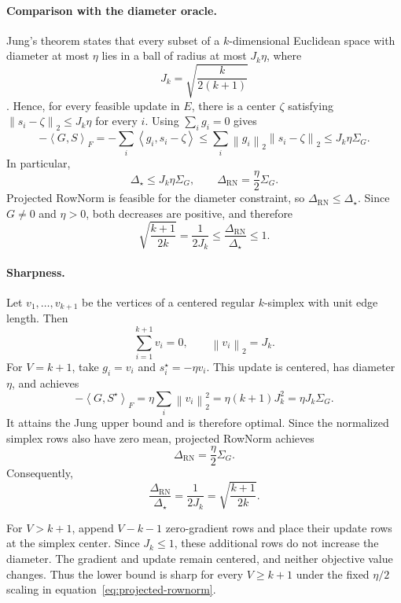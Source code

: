 \documentclass[anon]{opt2026} %
\newcommand{\norm}[1]{\left\lVert #1\right\rVert}
\newcommand{\inner}[2]{\left\langle #1,#2\right\rangle}
\begin{document}
\paragraph{Comparison with the diameter oracle.}
Jung's theorem states that every subset of a $k$-dimensional Euclidean space
with diameter at most $\eta$ lies in a ball of radius at most
$J_k\eta$, where
\[
J_k=\sqrt{\frac{k}{2(k+1)}}
\]
\citep{Jung1901,article}. Hence, for every feasible
update in $E$, there is a center $\zeta$ satisfying
$\norm{s_i-\zeta}_2\leq J_k\eta$ for every $i$. Using
$\sum_i g_i=0$ gives
\[
-\inner{G}{S}_F
=
-\sum_i\inner{g_i}{s_i-\zeta}
\leq
\sum_i\norm{g_i}_2\norm{s_i-\zeta}_2
\leq
J_k\eta\Sigma_G.
\]
In particular,
\[
\Delta_\star\leq J_k\eta\Sigma_G,
\qquad
\Delta_{\mathrm{RN}}=\frac{\eta}{2}\Sigma_G.
\]
Projected RowNorm is feasible for the diameter constraint, so
$\Delta_{\mathrm{RN}}\leq\Delta_\star$. Since
$G\neq0$ and $\eta>0$, both decreases are positive, and therefore
\[
\boxed{
\sqrt{\frac{k+1}{2k}}
=
\frac{1}{2J_k}
\leq
\frac{\Delta_{\mathrm{RN}}}{\Delta_\star}
\leq
1.
}
\]

\paragraph{Sharpness.}
Let $v_1,\ldots,v_{k+1}$ be the vertices of a centered regular
$k$-simplex with unit edge length. Then
\[
\sum_{i=1}^{k+1}v_i=0,
\qquad
\norm{v_i}_2=J_k.
\]
For $V=k+1$, take $g_i=v_i$ and $s_i^\star=-\eta v_i$. This update is
centered, has diameter $\eta$, and achieves
\[
-\inner{G}{S^\star}_F
=
\eta\sum_i\norm{v_i}_2^2
=
\eta(k+1)J_k^2
=
\eta J_k\Sigma_G.
\]
It attains the Jung upper bound and is therefore optimal. Since the normalized
simplex rows also have zero mean, projected RowNorm achieves
\[
\Delta_{\mathrm{RN}}
=
\frac{\eta}{2}\Sigma_G.
\]
Consequently,
\[
\frac{\Delta_{\mathrm{RN}}}{\Delta_\star}
=
\frac{1}{2J_k}
=
\sqrt{\frac{k+1}{2k}}.
\]

For $V>k+1$, append $V-k-1$ zero-gradient rows and place their update rows at
the simplex center. Since $J_k\leq1$, these additional rows do not increase
the diameter. The gradient and update remain centered, and neither objective
value changes. Thus the lower bound is sharp for every $V\geq k+1$ under the
fixed $\eta/2$ scaling in equation~\ref{eq:projected-rownorm}.
\end{document}
